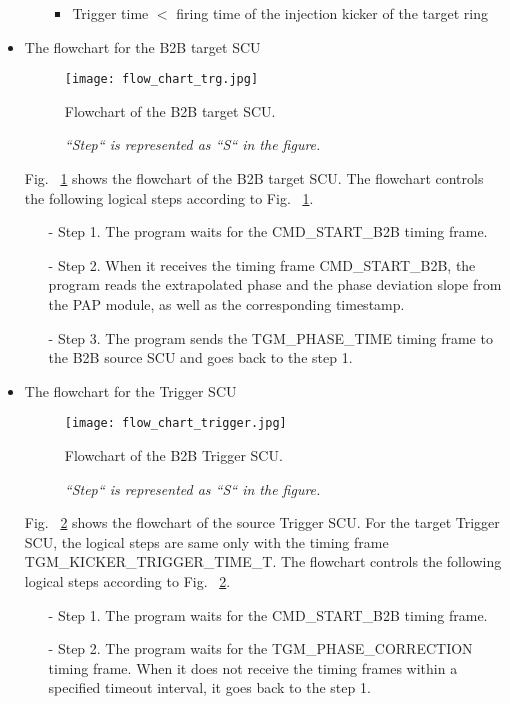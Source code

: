 \begin{itemize}
\begin{itemize}
\begin{itemize}
	\item Trigger time $<$ firing time of the injection kicker of the target ring

\end{itemize}
 

	\end{itemize}
\item The flowchart for the B2B target SCU
\begin{figure}[H]
   \centering   
   \texttt{[image: flow\_chart\_trg.jpg]}
   \caption{Flowchart of the B2B target SCU.}
	\caption*{\textsl{\small{``Step`` is represented as ``S`` in the figure. }}}
   \label{flow_chart_trg}
\end{figure}
Fig. ~\ref{flow_chart_trg} shows the flowchart of the B2B target SCU. The flowchart controls the following logical steps according to Fig. ~\ref{flow_chart_trg}.
 	\begin{itemize}
		\item[-]Step 1. The program waits for the CMD\_START\_B2B timing frame.
 		\item[-]Step 2. When it receives the timing frame CMD\_START\_B2B, the program reads the extrapolated phase and the phase deviation slope from the PAP module, as well as the corresponding timestamp.
		\item[-]Step 3. The program sends the TGM\_PHASE\_TIME timing frame to the B2B source SCU and goes back to the step 1.
	\end{itemize}
\item The flowchart for the Trigger SCU
\begin{figure}[H]
   \centering   
   \texttt{[image: flow\_chart\_trigger.jpg]}
   \caption{Flowchart of the B2B Trigger SCU.}
	\caption*{\textsl{\small{``Step`` is represented as ``S`` in the figure.}}}
   \label{flow_chart_trigger}
\end{figure}
Fig. ~\ref{flow_chart_trigger} shows the flowchart of the source Trigger SCU. For the target Trigger SCU, the logical steps are same only with the timing frame TGM\_KICKER\_TRIGGER\_TIME\_T. The flowchart controls the following logical steps according to Fig. ~\ref{flow_chart_trigger}.
 	\begin{itemize}
		\item[-]Step 1. The program waits for the CMD\_START\_B2B timing frame. 
		\item[-]Step 2. The program waits for the TGM\_PHASE\_CORRECTION timing frame. When it does not receive the timing frames within a specified timeout interval, it goes back to the step 1.

\end{itemize}
\end{itemize}
